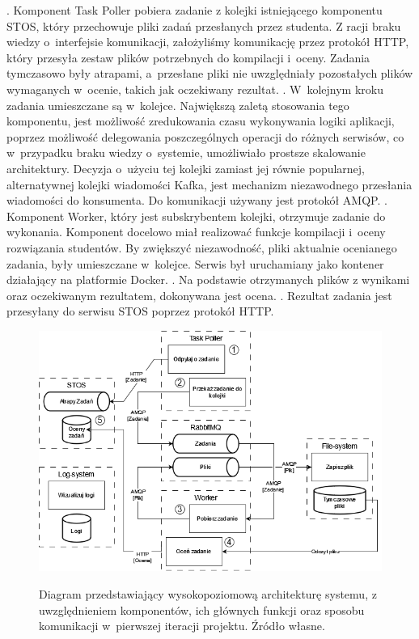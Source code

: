 \newline {}. Komponent Task Poller pobiera zadanie z kolejki istniejącego komponentu STOS, który przechowuje pliki zadań przesłanych przez studenta. Z racji braku wiedzy o~interfejsie komunikacji, założyliśmy komunikację przez protokół HTTP, który przesyła zestaw plików potrzebnych do kompilacji i~oceny. Zadania tymczasowo były atrapami, a~przesłane pliki nie uwzględniały pozostałych plików wymaganych w~ocenie, takich jak oczekiwany rezultat.
\newline {}. W~kolejnym kroku zadania umieszczane są w~kolejce. Największą zaletą stosowania tego komponentu, jest możliwość zredukowania czasu wykonywania logiki aplikacji, poprzez możliwość delegowania poszczególnych operacji do różnych serwisów, co w~przypadku braku wiedzy o~systemie, umożliwiało prostsze skalowanie architektury. Decyzja o~użyciu tej kolejki zamiast jej równie popularnej, alternatywnej kolejki wiadomości Kafka, jest mechanizm niezawodnego przesłania wiadomości do konsumenta. Do komunikacji używany jest protokół AMQP.
\newline {}. Komponent Worker, który jest subskrybentem kolejki, otrzymuje zadanie do wykonania. Komponent docelowo miał realizować funkcje kompilacji i~oceny rozwiązania studentów. By zwiększyć niezawodność, pliki aktualnie ocenianego zadania, były umieszczane w~kolejce. Serwis był uruchamiany jako kontener działający na platformie Docker.
\newline {}. Na podstawie otrzymanych plików z wynikami oraz oczekiwanym rezultatem, dokonywana jest ocena.
\newline {}. Rezultat zadania jest przesyłany do serwisu STOS poprzez protokół HTTP.
\begin{figure}[!h]
	\begin{center}
		\resizebox{1.0\textwidth}{!} {
			\includegraphics{img/1/i1_arch.png}
		}
		\caption[Architektura po pierwszej iteracji]{Diagram przedstawiający wysokopoziomową architekturę systemu, z uwzględnieniem komponentów, ich głównych funkcji oraz sposobu komunikacji w~pierwszej iteracji projektu. Źródło własne.}
	\end{center}
\end{figure}
